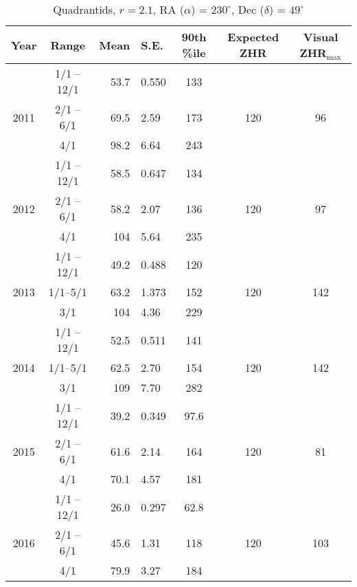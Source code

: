\begin{table}[h!]
	\centering
	\begin{tabular}{|c|c|r@{ \,$\pm$\, }lc|cc|}
		\hline 
		Year & Range & Mean & S.E. & 90th \%ile & Expected ZHR & Visual ZHR$_{\text{max}}$ \\ 
		\hline	
		& 1/1 -- 12/1 & 53.7 & 0.550 & 133   &  & \\ 
		2011 & 2/1 -- 6/1& 69.5 & 2.59 & 173   & 120&96 \\ 
		& 4/1& 98.2 & 6.64 & 243   & & \\ 
		\hline 
		& 1/1 -- 12/1& 58.5 & 0.647 & 134   & & \\ 
		2012 & 2/1 -- 6/1& 58.2 & 2.07 & 136   & 120&97 \\ 
		& 4/1& 104 & 5.64 & 235   & & \\ 
		\hline 
		& 1/1 -- 12/1& 49.2 & 0.488 & 120   & & \\ 
		2013 & 1/1--5/1& 63.2 & 1.373 & 152   &120 &142 \\ 
		& 3/1& 104 & 4.36 & 229   & & \\ 
		\hline 
		&1/1 -- 12/1 & 52.5 & 0.511 & 141   & & \\ 
		2014 & 1/1--5/1& 62.5 & 2.70 & 154   &120 & 142\\ 
		& 3/1& 109 & 7.70 & 282  & & \\ 
		\hline 
		& 1/1 -- 12/1& 39.2 & 0.349 & 97.6   & & \\ 
		2015 & 2/1 -- 6/1& 61.6 & 2.14 & 164   & 120& 81\\ 
		& 4/1& 70.1 & 4.57 & 181   & & \\ 
		\hline
		& 1/1 -- 12/1& 26.0 & 0.297 & 62.8	& & \\
		2016 & 2/1 -- 6/1& 45.6 & 1.31 & 118   &120 &103 \\ 
		& 4/1& 79.9 & 3.27 & 184   & & \\ 
		\hline 
	\end{tabular}
	\caption{Quadrantids, $r = 2.1$, RA ($\alpha$) = $230^{\circ}$, Dec ($\delta$) = $49^{\circ}$} 
\end{table}

